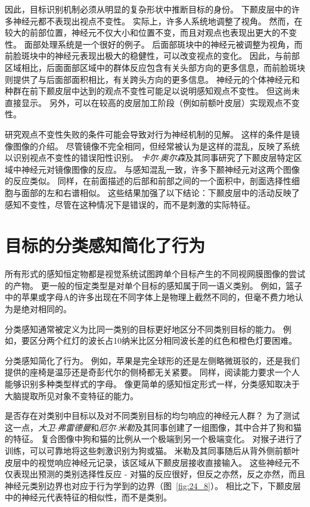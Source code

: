 因此，目标识别机制必须从明显的复杂形状中推断目标的身份。
下颞皮层中的许多神经元都不表现出视点不变性。
实际上，许多人系统地调整了视角。
然而，在较大的前部位置，神经元不仅大小和位置不变，而且对观点也表现出更大的不变性。
面部处理系统是一个很好的例子。
后面部斑块中的神经元被调整为视角，而前脸斑块中的神经元表现出极大的稳健性，可以改变视点的变化。
因此，与前部区域相比，后面面部区域中的群体反应包含有关头部方向的更多信息，而前脸斑块则提供了与后面部面积相比，有关跨头方向的更多信息。
神经元的个体神经元和种群在前下颞皮层中达到的观点不变性可能足以说明感知观点不变性。
但这尚未直接显示。
另外，可以在较高的皮层加工阶段（例如前额叶皮层）实现观点不变性。


研究观点不变性失败的条件可能会导致对行为神经机制的见解。
这样的条件是镜像图像的介绍。
尽管镜像不完全相同，但经常被认为是这样的混乱，反映了系统以识别视点不变性的错误阳性识别。
\textit{卡尔$\cdot$奥尔森}及其同事研究了下颞皮层特定区域中神经元对镜像图像的反应。
与感知混乱一致，许多下颞神经元对这两个图像的反应类似。
同样，在前面描述的后部和前部之间的一个面积中，剖面选择性细胞与面部的左和右谱相似。
这些结果加强了以下结论：下颞皮层中的活动反映了感知不变性，尽管在这种情况下是错误的，而不是刺激的实际特征。



\section{目标的分类感知简化了行为}

所有形式的感知恒定物都是视觉系统试图跨单个目标产生的不同视网膜图像的尝试的产物。
更一般的恒定类型是对单个目标的感知属于同一语义类别。
例如，篮子中的苹果或字母A的许多出现在不同字体上是物理上截然不同的，但毫不费力地认为是绝对相同的。


分类感知通常被定义为比同一类别的目标更好地区分不同类别目标的能力。
例如，要区分两个红灯的波长占10纳米比区分相同波长差的红色和橙色灯要困难。


分类感知简化了行为。
例如，苹果是完全球形的还是左侧略微斑驳的，还是我们提供的座椅是温莎还是奇彭代尔的侧椅都无关紧要。
同样，阅读能力要求一个人能够识别多种类型样式的字母。
像更简单的感知恒定形式一样，分类感知取决于大脑提取所见对象不变特征的能力。


是否存在对类别中目标以及对不同类别目标的均匀响应的神经元人群？
为了测试这一点，\textit{大卫$\cdot$弗雷德曼}和\textit{厄尔$\cdot$米勒}及其同事创建了一组图像，其中合并了狗和猫的特征。
复合图像中狗和猫的比例从一个极端到另一个极端变化。 
对猴子进行了训练，可以可靠地将这些刺激识别为狗或猫。
米勒及其同事随后从背外侧前额叶皮层中的视觉响应神经元记录，该区域从下颞皮层接收直接输入。
这些神经元不仅表现出预测的类别选择性反应 - 对猫的反应很好，但反之亦然，反之亦然，而且神经元类别边界也对应于行为学到的边界（图~\ref{fig:24_8}）。 
相比之下，下颞皮层中的神经元代表特征的相似性，而不是类别。


